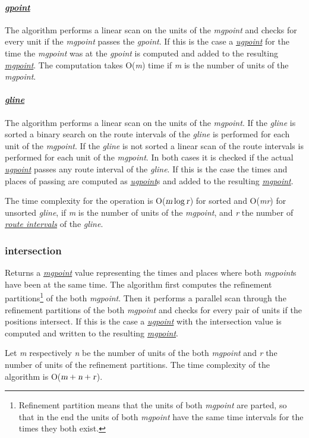 \documentclass[a4paper]{article}
\newcommand{\op}[1]{\textbf{#1}}
\newcommand{\var}[1]{\textsl{#1}}
\newcommand{\dt}[1]{\textsl{\underline{#1}}}
\begin{document}
\paragraph{\dt{gpoint}}
The algorithm performs a linear scan on the units of the \var{mgpoint} and checks for every unit if the \var{mgpoint} passes the \var{gpoint}. If this is the case a \dt{ugpoint} for the time the \var{mgpoint} was at the \var{gpoint} is computed and added to the resulting \dt{mgpoint}.  The computation takes O(\var{m}) time if \var{m} is the number of units of the \var{mgpoint}.
\paragraph{\dt{gline}}
The algorithm performs a linear scan on the units of the \var{mgpoint}. If the \var{gline} is sorted a binary search on the route intervals of the \var{gline} is performed for each unit of the \var{mgpoint}. If the \var{gline} is not sorted a linear scan of the route intervals is performed for each unit of the \var{mgpoint}. In both cases it is checked if the actual \dt{ugpoint} passes any route interval of the \var{gline}. If this is the case the times and places of passing are computed as \dt{ugpoint}s and added to the resulting \dt{mgpoint}.

The time complexity for the operation is O($\var{m} \log \var{r}$) for sorted and O(\var{mr}) for unsorted \var{gline}, if \var{m} is the number of units of the \var{mgpoint}, and \var{r} the number of \dt{route intervals} of the \var{gline}.
\subsubsection{\op{intersection}}
Returns a \dt{mgpoint} value representing the times and places where both \var{mgpoint}s have been at the same time. The algorithm first computes the refinement partitions\footnote{Refinement partition means that the units of both \var{mgpoint} are parted, so that in the end the units of both \var{mgpoint} have the same time intervals for the times they both exist.} of the both \var{mgpoint}. Then it performs a parallel scan through the refinement partitions of the both \var{mgpoint} and checks for every pair of units if the positions intersect. If this is the case a \dt{ugpoint} with the intersection value is computed and written to the resulting \dt{mgpoint}.

Let \var{m} respectively \var{n} be the number of units of the both \var{mgpoint} and \var{r} the number of units of the refinement partitions. The time complexity of the algorithm is O($\var{m} + \var{n} + \var{r}$).
\end{document}
